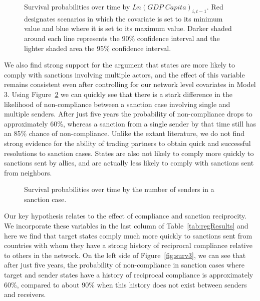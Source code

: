 \begin{figure}[ht]
	\centering
	\caption{Survival probabilities over time by $Ln(GDP \; Capita)_{i,t-1}$. Red designates scenarios in which the covariate is set to its minimum value and blue where it is set to its maximum value. Darker shaded around each line represents the 90\% confidence interval and the lighter shaded area the 95\% confidence interval.}
    \resizebox{.55\textwidth}{!}{}	
	\label{fig:monSurv}
\end{figure}

We also find strong support for the argument that states are more likely to comply with sanctions involving multiple actors, and the effect of this variable remains consistent even after controlling for our network level covariates in Model 3. Using Figure~\ref{fig:nosSurv} we can quickly see that there is a stark difference in the likelihood of non-compliance between a sanction case involving single and multiple senders. After just five years the probability of non-compliance drops to approximately 60\%, whereas a sanction from a single sender by that time still has an 85\% chance of non-compliance. Unlike the extant literature, we do not find strong evidence for the ability of trading partners to obtain quick and successful resolutions to sanction cases. States are also not likely to comply more quickly to sanctions sent by allies, and are actually less likely to comply with sanctions sent from neighbors. 

\begin{figure}[ht]
	\centering
	\caption{Survival probabilities over time by the number of senders in a sanction case.}
	\resizebox{0.55\textwidth}{!}{}
	\label{fig:nosSurv}
\end{figure}

Our key hypothesis relates to the effect of compliance and sanction reciprocity. We incorporate these variables in the last column of Table~\ref{tab:regResults} and here we find that target states comply much more quickly to sanctions sent from countries with whom they have a strong history of reciprocal compliance relative to others in the network. On the left side of Figure~\ref{fig:surv3}, we can see that after just five years, the probability of non-compliance in sanction cases where target and sender states have a history of reciprocal compliance is approximately 60\%, compared to about 90\% when this history does not exist between senders and receivers. 

